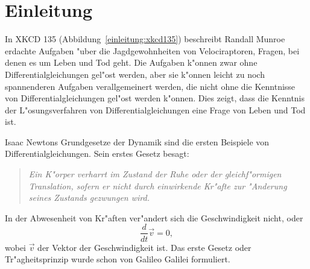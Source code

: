 %
%
%
\chapter{Einleitung\label{chapter:einleitung}}
\rhead{}
In XKCD 135 (Abbildung~\ref{einleitung:xkcd135})
%
%
beschreibt Randall Munroe erdachte Aufgaben "uber die
Jagdgewohnheiten von Velociraptoren, Fragen, bei denen es um Leben
und Tod geht.
Die Aufgaben k"onnen zwar ohne Differentialgleichungen gel"ost
werden, aber sie k"onnen leicht zu noch spannenderen Aufgaben
verallgemeinert werden, die nicht ohne die Kenntnisse von 
Differentialgleichungen gel"ost werden k"onnen.
Dies zeigt, dass die Kenntnis der L"osungsverfahren von Differentialgleichungen
eine Frage von Leben und Tod ist.

Isaac Newtons Grundgesetze der Dynamik sind die ersten Beispiele
von Differentialgleichungen.
Sein erstes Gesetz besagt:
\begin{quote}
\em
Ein K"orper verharrt im Zustand der Ruhe oder der gleichf"ormigen Translation,
sofern er nicht durch einwirkende Kr"afte zur "Anderung seines Zustands
gezwungen wird.
\end{quote}
In der Abwesenheit von Kr"aften ver"andert sich die Geschwindigkeit nicht,
oder 
\[
\frac{d}{dt}\vec{v}=0,
\]
wobei $\vec{v}$ der Vektor der Geschwindigkeit ist.
Das erste Gesetz oder Tr"agheitsprinzip wurde schon von Galileo Galilei
formuliert.
%

